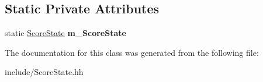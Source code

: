 \subsection*{Static Private Attributes}
\begin{DoxyCompactItemize}
\item 
\hypertarget{class_score_state_aa92cf238a5fbcf0a5a438610d065d66d}{}static \hyperlink{class_score_state}{Score\+State} {\bfseries m\+\_\+\+Score\+State}\label{class_score_state_aa92cf238a5fbcf0a5a438610d065d66d}

\end{DoxyCompactItemize}


The documentation for this class was generated from the following file\+:\begin{DoxyCompactItemize}
\item 
include/Score\+State.\+hh\end{DoxyCompactItemize}
